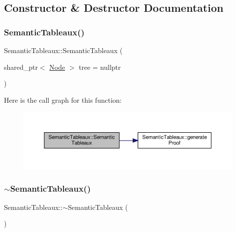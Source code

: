 \subsection{Constructor \& Destructor Documentation}
\mbox{\label{class_semantic_tableaux_a10b854a82ce27c588d45d82895aa7a45}} 
\subsubsection{\texorpdfstring{Semantic\+Tableaux()}{SemanticTableaux()}}
{\footnotesize\ttfamily Semantic\+Tableaux\+::\+Semantic\+Tableaux (\begin{DoxyParamCaption}\item[{shared\+\_\+ptr$<$ \hyperlink{class_node}{Node} $>$}]{tree = {\ttfamily nullptr} }\end{DoxyParamCaption})\hspace{0.3cm}{\ttfamily [explicit]}}

Here is the call graph for this function\+:\nopagebreak
\begin{figure}[H]
\begin{center}
\leavevmode
\includegraphics[width=350pt]{d6/d22/class_semantic_tableaux_a10b854a82ce27c588d45d82895aa7a45_cgraph}
\end{center}
\end{figure}
\mbox{\label{class_semantic_tableaux_a6c03c9108f2552c3756a5bdd6b6116f1}} 
\subsubsection{\texorpdfstring{$\sim$\+Semantic\+Tableaux()}{~SemanticTableaux()}}
{\footnotesize\ttfamily Semantic\+Tableaux\+::$\sim$\+Semantic\+Tableaux (\begin{DoxyParamCaption}{ }\end{DoxyParamCaption})}



